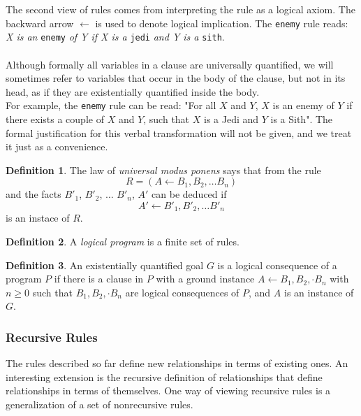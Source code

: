 \documentclass{report}
\theoremstyle{definition}
\theoremstyle{definition}
\newtheorem*{definition*}{Definition}
\newcommand{\ttt}[1]{\texttt{#1}}
\begin{document}
The second view of rules comes from interpreting the rule as a logical axiom. The backward arrow $\leftarrow$ is used to denote logical implication. The \ttt{enemy} rule reads: \textit{X is an} \ttt{enemy} \textit{of Y if X is a} \ttt{jedi} \textit{and Y is a} \ttt{sith}.\\\\
Although formally all variables in a clause are universally quantified, we will sometimes refer to variables that occur in the body of the clause, but not in its head, as if they are existentially quantified inside the body.\\

For example, the \ttt{enemy} rule can be read: "For all $X$ and $Y$, $X$ is an enemy of $Y$ if there exists a couple of $X$ and $Y$, such that $X$ is a Jedi and $Y$ is a Sith". The formal justification for this verbal transformation will not be given, and we treat it just as a convenience.
\begin{definition*}
	The law of \textit{universal modus ponens} says that from the rule $$R = (A \leftarrow B_1, B_2, \dots B_n)$$ and the facts $B'_1$, $B'_2$, $\dots$ $B'_n$, $A'$ can be deduced if  $$A' \leftarrow B'_1, B'_2, \dots B'_n$$ is an instace of $R$.
\end{definition*}
\begin{definition*}
	A \textit{logical program} is a finite set of rules.
\end{definition*}
\begin{definition*}
	An existentially quantified goal $G$ is a logical consequence of a program $P$ if there is a clause in $P$ with a ground instance $A \leftarrow B_1, B_2, \cdot B_n$ with $n \geq 0$ such that $B_1, B_2, \cdot B_n$ are logical consequences of $P$, and $A$ is an instance of $G$.
\end{definition*}
\pagebreak
\subsubsection{Recursive Rules} \label{ch:recursive-rules}
The rules described so far define new relationships in terms of existing ones. An interesting extension is the recursive definition of relationships that define relationships in terms of themselves. One way of viewing recursive rules is a generalization of a set of nonrecursive rules.\\
\end{document}
